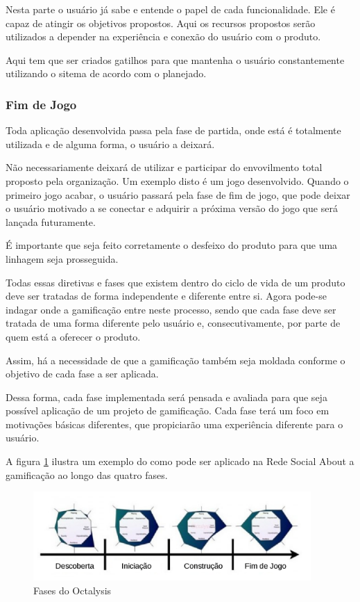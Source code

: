 Nesta parte o usuário já sabe e entende o papel de cada funcionalidade. Ele é capaz
de atingir os objetivos propostos. Aqui os recursos propostos serão utilizados
a depender na experiência e conexão do usuário com o produto.

Aqui tem que ser criados gatilhos para que mantenha o usuário constantemente utilizando
o sitema de acordo com o planejado.

\subsubsection{Fim de Jogo}
\label{sub:fim_de_jogo}
Toda aplicação desenvolvida passa pela fase de partida, onde está é totalmente utilizada
e de alguma forma, o usuário a deixará.

Não necessariamente deixará de utilizar e participar do envovilmento total proposto pela
organização. Um exemplo disto é um jogo desenvolvido. Quando o primeiro jogo acabar, o
usuário passará pela fase de fim de jogo, que pode deixar o usuário motivado a se conectar
e adquirir a próxima versão do jogo que será lançada futuramente.

É importante que seja feito corretamente o desfeixo do produto para que uma linhagem seja
prosseguida.


Todas essas diretivas e fases que existem dentro do ciclo de vida de um produto
deve ser
tratadas de forma independente e diferente entre si. Agora pode-se indagar onde
a gamificação
entre neste processo, sendo que cada fase deve ser tratada de uma forma diferente pelo
usuário e, consecutivamente, por parte de quem está a oferecer o produto.

Assim, há a necessidade de que a gamificação também seja moldada conforme o objetivo de
cada fase a ser aplicada.

Dessa forma, cada fase implementada será pensada e avaliada para que seja possível
aplicação de um  projeto de gamificação. Cada fase terá um foco em motivações
básicas diferentes, que propiciarão uma experiência diferente para o usuário.

A figura \ref{fig:fasesoctalysis} ilustra um exemplo do como pode ser aplicado na
Rede Social About a gamificação ao longo das quatro fases.

\begin{figure}[h]
    \centering
    \includegraphics[width=400px, scale=1]{figuras/fasesoctalysis}
    \caption{Fases do Octalysis}
    \label{fig:fasesoctalysis}
\end{figure}

